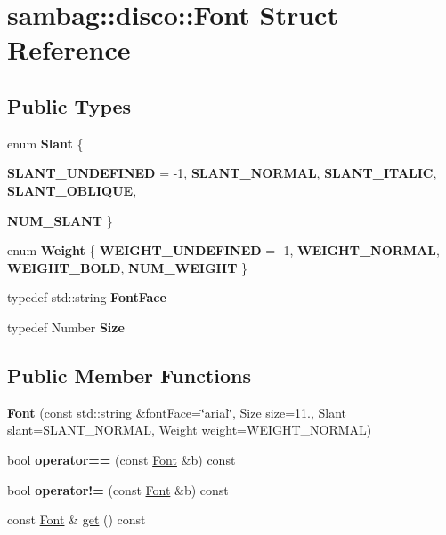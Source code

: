 \hypertarget{structsambag_1_1disco_1_1_font}{
\section{sambag::disco::Font Struct Reference}
\label{structsambag_1_1disco_1_1_font}
}
\subsection*{Public Types}
\begin{DoxyCompactItemize}
\item 
enum {\bfseries Slant} \{ \par
{\bfseries SLANT\_\-UNDEFINED} =  -\/1, 
{\bfseries SLANT\_\-NORMAL}, 
{\bfseries SLANT\_\-ITALIC}, 
{\bfseries SLANT\_\-OBLIQUE}, 
\par
{\bfseries NUM\_\-SLANT}
 \}
\item 
enum {\bfseries Weight} \{ {\bfseries WEIGHT\_\-UNDEFINED} =  -\/1, 
{\bfseries WEIGHT\_\-NORMAL}, 
{\bfseries WEIGHT\_\-BOLD}, 
{\bfseries NUM\_\-WEIGHT}
 \}
\item 
\hypertarget{structsambag_1_1disco_1_1_font_a25660acc9cf6e13c39fcf3c0f5dff2d3}{
typedef std::string {\bfseries FontFace}}
\label{structsambag_1_1disco_1_1_font_a25660acc9cf6e13c39fcf3c0f5dff2d3}

\item 
\hypertarget{structsambag_1_1disco_1_1_font_ab0c00cd26021fec406ea15771569e921}{
typedef Number {\bfseries Size}}
\label{structsambag_1_1disco_1_1_font_ab0c00cd26021fec406ea15771569e921}

\end{DoxyCompactItemize}
\subsection*{Public Member Functions}
\begin{DoxyCompactItemize}
\item 
\hypertarget{structsambag_1_1disco_1_1_font_a5f600618075073745636efbda02b407c}{
{\bfseries Font} (const std::string \&fontFace=\char`\"{}arial\char`\"{}, Size size=11., Slant slant=SLANT\_\-NORMAL, Weight weight=WEIGHT\_\-NORMAL)}
\label{structsambag_1_1disco_1_1_font_a5f600618075073745636efbda02b407c}

\item 
\hypertarget{structsambag_1_1disco_1_1_font_a324ebd0cf1c09a1ca0718fa2a39ddbd1}{
bool {\bfseries operator==} (const \hyperlink{structsambag_1_1disco_1_1_font}{Font} \&b) const }
\label{structsambag_1_1disco_1_1_font_a324ebd0cf1c09a1ca0718fa2a39ddbd1}

\item 
\hypertarget{structsambag_1_1disco_1_1_font_a4792b2676588f6385795a4cf0f0870d3}{
bool {\bfseries operator!=} (const \hyperlink{structsambag_1_1disco_1_1_font}{Font} \&b) const }
\label{structsambag_1_1disco_1_1_font_a4792b2676588f6385795a4cf0f0870d3}

\item 
const \hyperlink{structsambag_1_1disco_1_1_font}{Font} \& \hyperlink{structsambag_1_1disco_1_1_font_a976b75f75d25621519bf863de0f5ad2f}{get} () const 
\end{DoxyCompactItemize}
